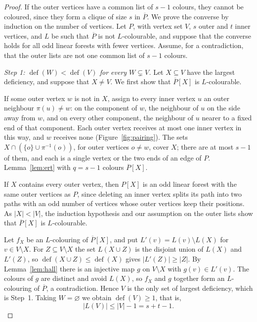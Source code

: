 \documentclass[11pt,a4paper,reqno]{amsart}
\theoremstyle{definition}
\theoremstyle{remark}
\newcommand{\df}{\operatorname{def}}
\begin{document}
\begin{proof}
If the outer vertices have a common list of $s-1$ colours, they cannot be coloured, since they form a clique of size $s$ in $\overline P$. We prove the converse by induction on the number of vertices. Let $P$, with vertex set $V$, $s$ outer and $t$ inner vertices, and $L$ be such that $\overline P$ is not $L$-colourable, and suppose that the converse holds for all odd linear forests with fewer vertices. Assume, for a contradiction, that the outer lists are not one common list of $s-1$ colours.

\smallskip\noindent\emph{Step 1: $\df(W)<\df(V)$ for every $W\subsetneq V$.} Let $X\subseteq V$ have the largest deficiency, and suppose that $X\ne V$. We first show that $\overline P[X]$ is $L$-colourable.

If some outer vertex $w$ is not in $X$, assign to every inner vertex $u$ an outer neighbour $\pi(u)\ne w$: on the component of $w$, the neighbour of $u$ on the side away from $w$, and on every other component, the neighbour of $u$ nearer to a fixed end of that component. Each outer vertex receives at most one inner vertex in this way, and $w$ receives none (Figure~\ref{fig:pairing}). The sets $X\cap(\{o\}\cup\pi^{-1}(o))$, for outer vertices $o\ne w$, cover $X$; there are at most $s-1$ of them, and each is a single vertex or the two ends of an edge of $P$. Lemma~\ref{lem:ert} with $q=s-1$ colours $\overline P[X]$.

If $X$ contains every outer vertex, then $P[X]$ is an odd linear forest with the same outer vertices as $P$, since deleting an inner vertex splits its path into two paths with an odd number of vertices whose outer vertices keep their positions. As $|X|<|V|$, the induction hypothesis and our assumption on the outer lists show that $\overline P[X]$ is $L$-colourable.

Let $f_X$ be an $L$-colouring of $\overline P[X]$, and put $L'(v)=L(v)\setminus L(X)$ for $v\in V\setminus X$. For $Z\subseteq V\setminus X$ the set $L(X\cup Z)$ is the disjoint union of $L(X)$ and $L'(Z)$, so $\df(X\cup Z)\le\df(X)$ gives $|L'(Z)|\ge|Z|$. By Lemma~\ref{lem:hall} there is an injective map $g$ on $V\setminus X$ with $g(v)\in L'(v)$. The colours of $g$ are distinct and avoid $L(X)$, so $f_X$ and $g$ together form an $L$-colouring of $\overline P$, a contradiction. Hence $V$ is the only set of largest deficiency, which is Step~1. Taking $W=\varnothing$ we obtain $\df(V)\ge1$, that is,
\begin{equation}\label{eq:LV}
|L(V)|\le|V|-1=s+t-1.
\end{equation}


\end{proof}
\end{document}
